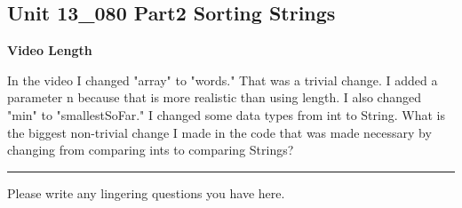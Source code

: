 \documentclass[letterpaper,12pt]{exam}
\newcommand{\unit}{Unit 13}
\begin{document}
\begin{questions}
\section*{\unit\_080 Part2 Sorting Strings } 
\par{\selectfont\textbf{Video Length }}
\begin{samepage}
    \question In the video I changed "array" to "words."  That was a trivial change.  I added a parameter n because that is more realistic than using length.  I also changed "min" to "smallestSoFar."  I changed some data types from int to String.  What is the biggest non-trivial change I made in the code that was made necessary by changing from comparing ints to comparing Strings?
    \vspace{5mm}
\end{samepage}

\begin{center}
    \rule{0.5\textwidth}{.4pt}
\end{center}
Please write any lingering questions you have here.
\end{questions}
\end{document}
